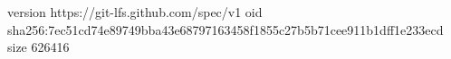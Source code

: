 version https://git-lfs.github.com/spec/v1
oid sha256:7ec51cd74e89749bba43e68797163458f1855c27b5b71cee911b1dff1e233ecd
size 626416
